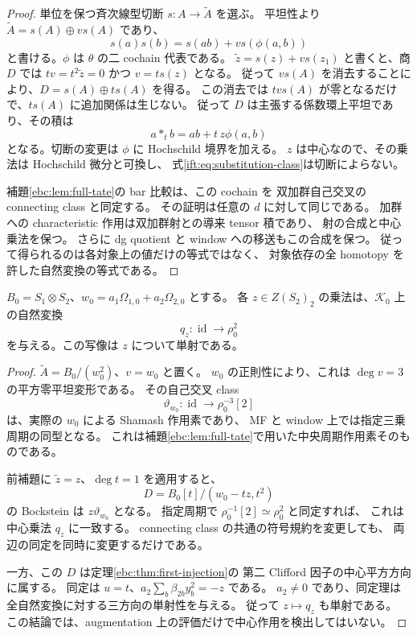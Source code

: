 \begin{proof}
単位を保つ斉次線型切断 $s:A\to\widetilde A$ を選ぶ。
平坦性より $\widetilde A=s(A)\oplus v s(A)$ であり、
\[
 s(a)s(b)=s(ab)+v s(\phi(a,b))
\]
と書ける。$\phi$ は $\theta$ の二 cochain 代表である。
$\widetilde z=s(z)+v s(z_1)$ と書くと、商 $D$ では
$tv=t^2\widetilde z=0$ かつ $v=t s(z)$ となる。
従って $v s(A)$ を消去することにより、$D=s(A)\oplus t s(A)$ を得る。
この消去では $t v s(A)$ が零となるだけで、$t s(A)$ に追加関係は生じない。
従って $D$ は主張する係数環上平坦であり、その積は
\[
       a*_t b=ab+t\,z\phi(a,b)
\]
となる。切断の変更は $\phi$ に Hochschild 境界を加える。
$z$ は中心なので、その乗法は Hochschild 微分と可換し、
式\eqref{ift:eq:substitution-class}は切断によらない。

補題\ref{ebc:lem:full-tate}の bar 比較は、この cochain を
双加群自己交叉の connecting class と同定する。
その証明は任意の $d$ に対して同じである。
加群への characteristic 作用は双加群射との導来 tensor 積であり、
射の合成と中心乗法を保つ。
さらに dg quotient と window への移送もこの合成を保つ。
従って得られるのは各対象上の値だけの等式ではなく、
対象依存の全 homotopy を許した自然変換の等式である。
\end{proof}

\begin{lemma}
\label{ift:lem:center-action}
$B_0=S_1\otimes S_2$、$w_0=a_1\Omega_{1,0}+a_2\Omega_{2,0}$ とする。
各 $z\in Z(S_2)_2$ の乗法は、$\mathcal K_0$ 上の自然変換
\[
             q_z:\operatorname{id}\longrightarrow\rho_0^2
\]
を与える。この写像は $z$ について単射である。
\end{lemma}

\begin{proof}
$\widetilde A=B_0/(w_0^2)$、$v=w_0$ と置く。
$w_0$ の正則性により、これは $\deg v=3$ の平方零平坦変形である。
その自己交叉 class
\[
 \vartheta_{w_0}:\operatorname{id}
                  \longrightarrow\rho_0^{-3}[2]
\]
は、実際の $w_0$ による Shamash 作用素であり、
MF と window 上では指定三乗周期の同型となる。
これは補題\ref{ebc:lem:full-tate}で用いた中央周期作用素そのものである。

前補題に $\widetilde z=z$、$\deg t=1$ を適用すると、
\[
 D=B_0[t]/(w_0-tz,t^2)
\]
の Bockstein は $z\vartheta_{w_0}$ となる。
指定周期で $\rho_0^{-1}[2]\simeq\rho_0^2$ と同定すれば、
これは中心乗法 $q_z$ に一致する。
connecting class の共通の符号規約を変更しても、
両辺の同定を同時に変更するだけである。

一方、この $D$ は定理\ref{ebc:thm:first-injection}の
第二 Clifford 因子の中心平方方向に属する。
同定は $u=t$、$a_2\sum_b\beta_{2b}y_b^2=-z$ である。
$a_2\ne0$ であり、同定理は全自然変換に対する三方向の単射性を与える。
従って $z\mapsto q_z$ も単射である。
この結論では、augmentation 上の評価だけで中心作用を検出してはいない。
\end{proof}

